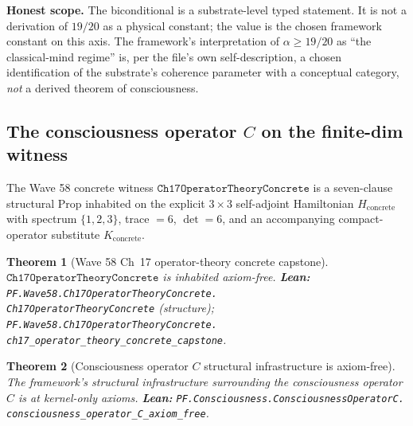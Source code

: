 \documentclass[11pt,a4paper]{article}
\theoremstyle{plain}
\newtheorem{theorem}{Theorem}[section]
\theoremstyle{definition}
\begin{document}
\noindent\textbf{Honest scope.} The biconditional is a substrate-level
typed statement. It is not a derivation of $19/20$ as a physical
constant; the value is the chosen framework constant on this axis.
The framework's interpretation of $\alpha \ge 19/20$ as ``the
classical-mind regime'' is, per the file's own self-description, a
chosen identification of the substrate's coherence parameter with a
conceptual category, \emph{not} a derived theorem of consciousness.

\subsection{The consciousness operator $C$ on the finite-dim witness}
\label{sec:operator-c}

The Wave 58 concrete witness $\mathtt{Ch17OperatorTheoryConcrete}$ is
a seven-clause structural Prop inhabited on the explicit $3 \times 3$
self-adjoint Hamiltonian $H_{\mathrm{concrete}}$ with spectrum
$\{1, 2, 3\}$, trace $= 6$, $\det = 6$, and an accompanying
compact-operator substitute $K_{\mathrm{concrete}}$.

\begin{theorem}[Wave 58 Ch~17 operator-theory concrete capstone]
\label{thm:ch17-concrete}
$\mathtt{Ch17OperatorTheoryConcrete}$ is inhabited axiom-free.
\textbf{Lean:}
\texttt{PF.Wave58.Ch17OperatorTheoryConcrete.\\
Ch17OperatorTheoryConcrete} (structure);
\texttt{PF.Wave58.Ch17OperatorTheoryConcrete.\\
ch17\_operator\_theory\_concrete\_capstone}.
\end{theorem}

\begin{theorem}[Consciousness operator $C$ structural infrastructure
is axiom-free]
\label{thm:operator-c-axiom-free}
The framework's structural infrastructure surrounding the
consciousness operator $C$ is at kernel-only axioms.
\textbf{Lean:}
\texttt{PF.Consciousness.ConsciousnessOperatorC.\\
consciousness\_operator\_C\_axiom\_free}.
\end{theorem}

\noindent{}
\end{document}
